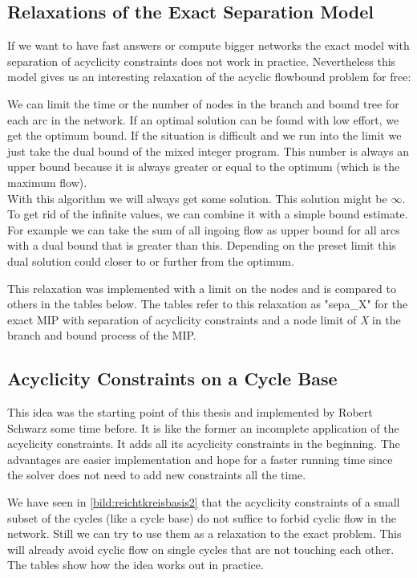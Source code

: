 \subsection{Relaxations of the Exact Separation Model}
If we want to have fast answers or compute bigger networks the exact model with separation of acyclicity 
constraints does not work in practice. Nevertheless this model gives us an interesting relaxation of the acyclic 
flowbound problem for free: 

We can limit the time or the number of nodes in the branch and bound tree for each arc in the network. If an optimal 
solution can be found with low effort, we get the optimum bound. If the situation is difficult and we run into the 
limit 
we just take the dual bound of the mixed integer program. This number is always an upper bound because it is always 
greater or equal to the optimum (which is the maximum flow). \\

With this algorithm we will always get some solution. This solution might be $\infty$. To get rid of the infinite 
values, we can combine it with a simple bound estimate. For example we can take the sum of all ingoing flow as upper 
bound for all arcs with a dual bound that is greater than this. Depending on the preset limit this dual solution could
closer to or further from the optimum. 

This relaxation was implemented with a limit on the nodes and is compared to 
others in the tables below. The tables refer to this relaxation as "sepa\_X" for the exact MIP with separation of 
acyclicity constraints and a node limit of \textit{X} in the branch and bound process of the MIP.

\subsection{Acyclicity Constraints on a Cycle Base}%
This idea was the starting point of this thesis and implemented by Robert Schwarz some time before. It is like the 
former an incomplete application of the acyclicity constraints. It adds all its acyclicity constraints in the 
beginning. The advantages are easier implementation and hope for a faster running time since the solver does not need 
to add new constraints all the time.

We have seen in \ref{bild:reichtkreisbasis2} that the acyclicity constraints of a small subset of the cycles (like a 
cycle base) do not suffice to forbid cyclic flow  in the network. Still we can try to use them as a relaxation to the 
exact problem. This will already avoid cyclic flow on single cycles that are not touching each other. The tables show 
how the idea works out in practice.

